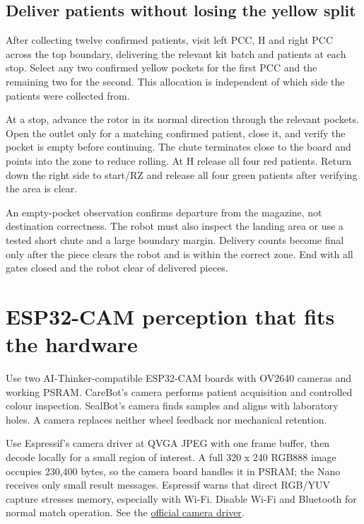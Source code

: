\documentclass[10pt,a4paper]{article}
\begin{document}
\subsection{Deliver patients without losing the yellow split}
After collecting twelve confirmed patients, visit left PCC, H and right PCC across the top boundary, delivering the relevant kit batch and patients at each stop. Select any two confirmed yellow pockets for the first PCC and the remaining two for the second. This allocation is independent of which side the patients were collected from.

At a stop, advance the rotor in its normal direction through the relevant pockets. Open the outlet only for a matching confirmed patient, close it, and verify the pocket is empty before continuing. The chute terminates close to the board and points into the zone to reduce rolling. At H release all four red patients. Return down the right side to start/RZ and release all four green patients after verifying the area is clear.

An empty-pocket observation confirms departure from the magazine, not destination correctness. The robot must also inspect the landing area or use a tested short chute and a large boundary margin. Delivery counts become final only after the piece clears the robot and is within the correct zone. End with all gates closed and the robot clear of delivered pieces.

\section{ESP32-CAM perception that fits the hardware}
Use two AI-Thinker-compatible ESP32-CAM boards with OV2640 cameras and working PSRAM. CareBot's camera performs patient acquisition and controlled colour inspection. SealBot's camera finds samples and aligns with laboratory holes. A camera replaces neither wheel feedback nor mechanical retention.

Use Espressif's camera driver at QVGA JPEG with one frame buffer, then decode locally for a small region of interest. A full 320 x 240 RGB888 image occupies 230,400 bytes, so the camera board handles it in PSRAM; the Nano receives only small result messages. Espressif warns that direct RGB/YUV capture stresses memory, especially with Wi-Fi. Disable Wi-Fi and Bluetooth for normal match operation. See the \href{https://github.com/espressif/esp32-camera}{official camera driver}.
\end{document}
